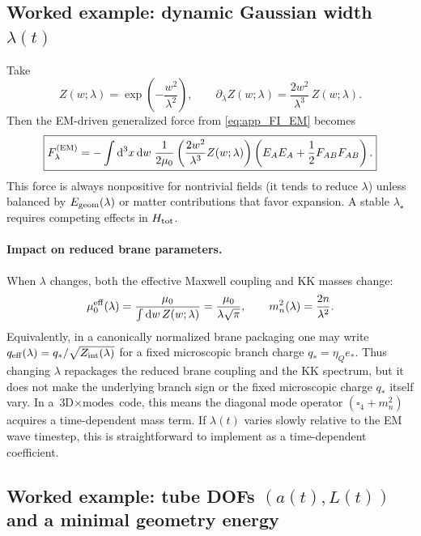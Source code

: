 \documentclass[11pt]{article}
\newcommand{\Zint}{Z_{\rm int}}
\begin{document}
\subsection{Worked example: dynamic Gaussian width \texorpdfstring{$\lambda(t)$}{lambda(t)}}
\label{app:geom_lambda_example}

Take
\begin{equation}
Z(w;\lambda)=\exp\!\left(-\frac{w^2}{\lambda^2}\right),
\qquad
\partial_\lambda Z(w;\lambda)=\frac{2w^2}{\lambda^3}\,Z(w;\lambda).
\label{eq:app_dZ_dlambda}
\end{equation}
Then the EM-driven generalized force from \eqref{eq:app_FI_EM} becomes
\begin{equation}
\boxed{
F_\lambda^{({\rm EM})}
=
-\int \dd^3x\,\dd w\;
\frac{1}{2\mu_0}
\left(\frac{2w^2}{\lambda^3}Z(w;\lambda)\right)
\left(
E_AE_A+\frac12 F_{AB}F_{AB}
\right).
}
\label{eq:app_Flambda_EM}
\end{equation}
This force is always nonpositive for nontrivial fields (it tends to reduce \(\lambda\))
unless balanced by \(E_{\rm geom}(\lambda)\) or matter contributions that favor expansion.
A stable \(\lambda_\star\) requires competing effects in \(H_{\rm tot}\).

\paragraph{Impact on reduced brane parameters.}
When \(\lambda\) changes, both the effective Maxwell coupling and KK masses change:
\begin{equation}
\mu_0^{\rm eff}(\lambda) = \frac{\mu_0}{\int \dd w\,Z(w;\lambda)}
= \frac{\mu_0}{\lambda\sqrt{\pi}},
\qquad
m_n^2(\lambda)=\frac{2n}{\lambda^2}.
\end{equation}
Equivalently, in a canonically normalized brane packaging one may write
\(q_{\rm eff}(\lambda)=q_*/\sqrt{\Zint(\lambda)}\) for a fixed microscopic branch
charge \(q_*=\eta_Q e_*\). Thus changing \(\lambda\) repackages the reduced brane
coupling and the KK spectrum, but it does not make the underlying branch sign or
the fixed microscopic charge \(q_*\) itself vary.
In a \(\text{3D}\times\text{modes}\) code, this means the diagonal mode operator
\((\square_4+m_n^2)\) acquires a time-dependent mass term. If \(\lambda(t)\) varies slowly
relative to the EM wave timestep, this is straightforward to implement as a time-dependent
coefficient.

\subsection{Worked example: tube DOFs \texorpdfstring{$(a(t),L(t))$}{(a(t),L(t))} and a minimal geometry energy}
\label{app:geom_aL_example}
\end{document}
